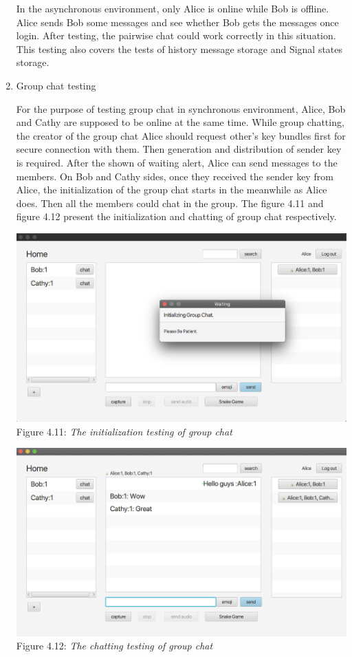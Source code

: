 \begin{enumerate}[label=(\roman*)]
In the asynchronous environment, only Alice is online while Bob is offline. Alice sends Bob some messages and see whether Bob gets the messages once login. After testing, the pairwise chat could work correctly in this situation. This testing also covers the tests of history message storage and Signal states storage.

\item Group chat testing

For the purpose of testing group chat in synchronous environment, Alice, Bob and Cathy are supposed to be online at the same time. While group chatting, the creator of the group chat Alice should request other's key bundles first for secure connection with them. Then generation and distribution of sender key is required. After the shown of waiting alert, Alice can send messages to the members. On Bob and Cathy sides, once they received the sender key from Alice, the initialization of the group chat starts in the meanwhile as Alice does. Then all the members could chat in the group. The figure 4.11 and figure 4.12 present the initialization and chatting of group chat respectively.

\begin{center}
\includegraphics[scale=.45]{../4-Implementation/resources/group-init.png}\\
Figure 4.11: \textit{The initialization testing of group chat}
\end{center}

\begin{center}
\includegraphics[scale=.45]{../4-Implementation/resources/group-chat.png}\\
Figure 4.12: \textit{The chatting testing of group chat}
\end{center}


\end{enumerate}
